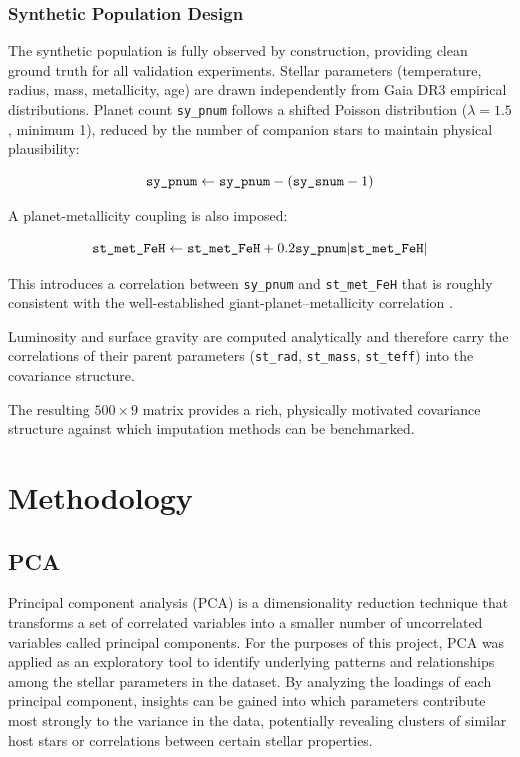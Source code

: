 \documentclass[preprint,longauthor,twocolumn]{aastex631}
\begin{document}
\subsubsection{Synthetic Population Design}

The synthetic population is fully observed by construction, providing clean ground truth for all validation experiments. Stellar parameters (temperature, radius, mass, metallicity, age) are drawn independently from Gaia DR3 empirical distributions. Planet count \verb|sy_pnum| follows a shifted Poisson distribution ($\lambda = 1.5$, minimum 1), reduced by the number of companion stars to maintain physical plausibility:

\begin{equation}
  \verb|sy_pnum| \leftarrow \verb|sy_pnum| - (\verb|sy_snum|-1)
\end{equation}

A planet-metallicity coupling is also imposed:

\begin{equation}
  \verb|st_met_FeH| \leftarrow \verb|st_met_FeH| + 0.2\verb|sy_pnum||\verb|st_met_FeH||
\end{equation}

This introduces a correlation between \verb|sy_pnum| and \verb|st_met_FeH| that is roughly consistent with the well-established giant-planet--metallicity correlation \citep{johnsonGiantPlanetOccurrence2010,gonzalezStellarMetallicityGiant1997}.

Luminosity and surface gravity are computed analytically and therefore carry the correlations of their parent parameters (\texttt{st\_rad}, \texttt{st\_mass}, \texttt{st\_teff}) into the covariance structure.

The resulting $500 \times 9$ matrix provides a rich, physically motivated covariance structure against which imputation methods can be benchmarked.

\section{Methodology}

\subsection{PCA}

Principal component analysis (PCA) is a dimensionality reduction technique that transforms a set of correlated variables into a smaller number of uncorrelated variables called principal components. For the purposes of this project, PCA was applied as an exploratory tool to identify underlying patterns and relationships among the stellar parameters in the dataset. By analyzing the loadings of each principal component, insights can be gained into which parameters contribute most strongly to the variance in the data, potentially revealing clusters of similar host stars or correlations between certain stellar properties.
\end{document}
